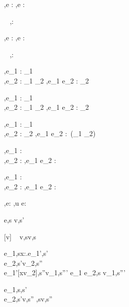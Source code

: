   {\Gamma,\Sigma \infers e : \tau}
  {\Gamma,\Sigma \infers \Edit e : \Task \tau}

  {\ }
  {\Gamma,\Sigma \infers \Enter \tau : \Task \tau}

  {\Gamma,\Sigma \infers e : \Reference \tau}
  {\Gamma,\Sigma \infers \Update e : \Task \tau}


  {\ }
  {\Gamma,\Sigma \infers \Fail : \Task \tau}


  {\Gamma,\Sigma \infers e_1 : \Task \tau_1 \\
   \Gamma,\Sigma \infers e_2 : \tau_1 \to \Task \tau_2}
  {\Gamma,\Sigma \infers e_1 \Then e_2 : \Task \tau_2}


  {\Gamma,\Sigma \infers e_1 : \Task \tau_1 \\
   \Gamma,\Sigma \infers e_2 : \tau_1 \to \Task \tau_2}
  {\Gamma,\Sigma \infers e_1 \Next e_2 : \Task \tau_2}


  {\Gamma,\Sigma \infers e_1 : \Task \tau_1 \\
   \Gamma,\Sigma \infers e_2 : \Task \tau_2}
  {\Gamma,\Sigma \infers e_1 \And e_2 : \Task\,(\tau_1 \times \tau_2)}


  {\Gamma,\Sigma \infers e_1 : \Task \tau \\
   \Gamma,\Sigma \infers e_2 : \Task \tau }
  {\Gamma,\Sigma \infers e_1 \Or e_2 : \Task \tau}


  {\Gamma,\Sigma \infers e_1 : \Task \tau \\
   \Gamma,\Sigma \infers e_2 : \Task \tau }
  {\Gamma,\Sigma \infers e_1 \Xor e_2 : \Task \tau}


  {\Gamma,\Sigma\infers e:\Task\tau}
  {\Gamma,\Sigma\infers u \At e:\Task\tau}





  {e,s \evaluate v,s'}


[v\in{}]
  {\ }
  {v,s\evaluate v,s}

  {e_1,s\evaluate \lambda x:\tau.e_1',s'\\
   e_2,s'\evaluate v_2,s''\\
   e_1'[x\mapsto v_2],s''\evaluate v_1,s'''}
  {e_1 e_2,s \evaluate v_1,s'''}


    {e_1,s\evaluate \True,s'\\
     e_2,s'\evaluate v,s''}
    {,s\evaluate v,s''}

